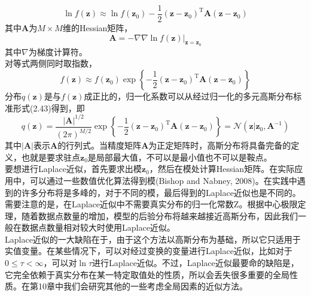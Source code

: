 \documentclass[b5paper]{book}
\numberwithin{equation}{chapter}
\newcommand {\rmT} {\mathrm{T}}
\newcommand {\calN} {\mathcal{N}}
\begin{document}
{	\begin{equation}
		\ln f(\mathbf{z}) \approx \ln f(\mathbf{z}_0) - \frac{1}{2} (\mathbf{z} - \mathbf{z}_0)^{\rmT} \mathbf{A} (\mathbf{z} - \mathbf{z}_0)
	\end{equation}
	其中$\mathbf{A}$为$M \times M$维的Hessian矩阵，
	\begin{equation}
		\mathbf{A} = -\nabla \nabla \ln f(\mathbf{z})|_{\mathbf{z} = \mathbf{z}_0}
	\end{equation}
	其中$\nabla$为梯度计算符。\\
	\indent 对等式两侧同时取指数，
	\begin{equation}
		f(\mathbf{z}) \approx f(\mathbf{z}_0)\exp \left\{-\frac{1}{2}(\mathbf{z} - \mathbf{z}_0)^{\rmT}\mathbf{A}(\mathbf{z} - \mathbf{z}_0)\right\}
	\end{equation}
	分布$q(\mathbf{z})$是与$f(\mathbf{z})$成正比的，归一化系数可以从经过归一化的多元高斯分布标准形式(2.43)得到，即
	\begin{equation}
		q(\mathbf{z}) = \frac{|\mathbf{A}|^{1/2}}{(2 \pi)^{M/2}}\exp \left\{-\frac{1}{2}(\mathbf{z}-\mathbf{z}_0)^{\rmT}\mathbf{A}(\mathbf{z}-\mathbf{z}_0)\right\} = \calN(\mathbf{z}|\mathbf{z}_0, \mathbf{A}^{-1})
	\end{equation}
	其中$|\mathbf{A}|$表示$\mathbf{A}$的行列式。当精度矩阵$\mathbf{A}$为正定矩阵时，高斯分布将具备完备的定义，也就是要求驻点$\mathbf{z}_0$是局部最大值，不可以是最小值也不可以是鞍点。\\
	\indent 要想进行Laplace近似，首先要求出模$\mathbf{z}_0$，然后在模处计算Hessian矩阵。在实际应用中，可以通过一些数值优化算法得到模(Bishop and Nabney, 2008)。在实践中遇到的许多分布将是多峰的，对于不同的模，最后得到的Laplace近似也是不同的。需要注意的是，在Laplace近似中不需要真实分布的归一化常数Z。根据中心极限定理，随着数据点数量的增加，模型的后验分布将越来越接近高斯分布，因此我们一般在数据点数量相对较大时使用Laplace近似。\\
	\indent Laplace近似的一大缺陷在于，由于这个方法以高斯分布为基础，所以它只适用于实值变量。在某些情况下，可以对经过变换的变量进行Laplace近似，比如对于$0 \leqslant \tau < \infty$，可以对$\ln \tau$进行Laplace近似。不过，Laplace近似最要命的缺陷是，它完全依赖于真实分布在某一特定取值处的性质，所以会丢失很多重要的全局性质。在第10章中我们会研究其他的一些考虑全局因素的近似方法。
	}
\end{document}
